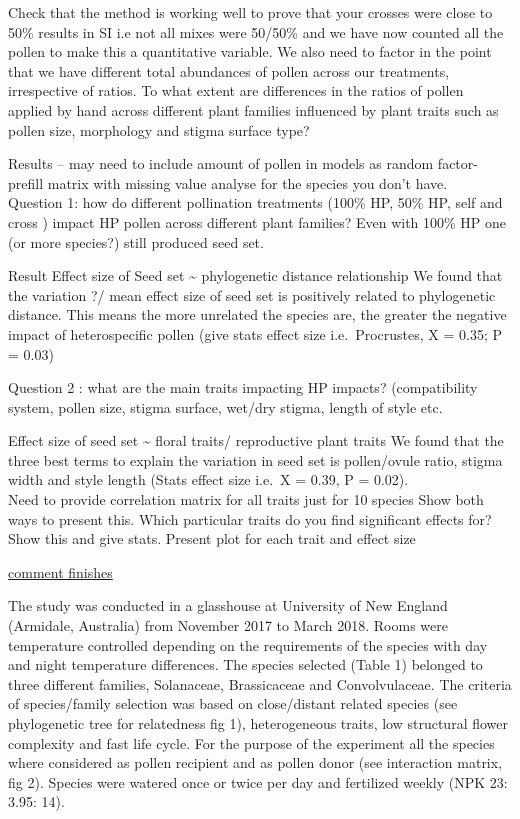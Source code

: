 \documentclass[11pt,a4paper]{article}
\begin{document}
Check that the method is working well to prove that your crosses were
close to 50\% results in SI i.e not all mixes were 50/50\% and we have
now counted all the pollen to make this a quantitative variable. We also
need to factor in the point that we have different total abundances of
pollen across our treatments, irrespective of ratios. To what extent are
differences in the ratios of pollen applied by hand across different
plant families influenced by plant traits such as pollen size,
morphology and stigma surface type?

Results -- may need to include amount of pollen in models as random
factor- prefill matrix with missing value analyse for the species you
don't have.\\
Question 1: how do different pollination treatments (100\% HP, 50\% HP,
self and cross ) impact HP pollen across different plant families? Even
with 100\% HP one (or more species?) still produced seed set.

Result Effect size of Seed set \textasciitilde{} phylogenetic distance
relationship We found that the variation ?/ mean effect size of seed set
is positively related to phylogenetic distance. This means the more
unrelated the species are, the greater the negative impact of
heterospecific pollen (give stats effect size i.e.~Procrustes, X = 0.35;
P = 0.03)

Question 2 : what are the main traits impacting HP impacts?
(compatibility system, pollen size, stigma surface, wet/dry stigma,
length of style etc.

Effect size of seed set \textasciitilde{} floral traits/ reproductive
plant traits We found that the three best terms to explain the variation
in seed set is pollen/ovule ratio, stigma width and style length (Stats
effect size i.e.~X = 0.39, P = 0.02).\\
Need to provide correlation matrix for all traits just for 10 species
Show both ways to present this. Which particular traits do you find
significant effects for? Show this and give stats. Present plot for each
trait and effect size

\href{}{comment finishes}

The study was conducted in a glasshouse at University of New England
(Armidale, Australia) from November 2017 to March 2018. Rooms were
temperature controlled depending on the requirements of the species with
day and night temperature differences. The species selected (Table 1)
belonged to three different families, Solanaceae, Brassicaceae and
Convolvulaceae. The criteria of species/family selection was based on
close/distant related species (see phylogenetic tree for relatedness fig
1), heterogeneous traits, low structural flower complexity and fast life
cycle. For the purpose of the experiment all the species where
considered as pollen recipient and as pollen donor (see interaction
matrix, fig 2). Species were watered once or twice per day and
fertilized weekly (NPK 23: 3.95: 14).
\end{document}
